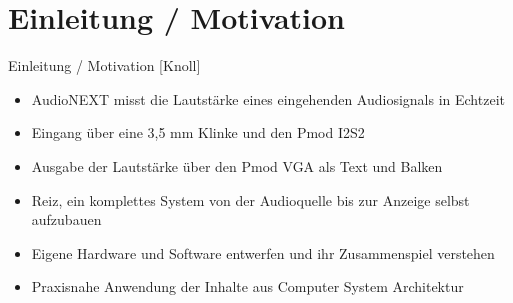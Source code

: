 \section{Einleitung / Motivation}
\begin{frame}{Einleitung / Motivation [Knoll]}
    \begin{itemize}
        \item AudioNEXT misst die Lautstärke eines eingehenden Audiosignals in Echtzeit
        \item Eingang über eine 3,5 mm Klinke und den Pmod I2S2
        \item Ausgabe der Lautstärke über den Pmod VGA als Text und Balken
        \item Reiz, ein komplettes System von der Audioquelle bis zur Anzeige selbst aufzubauen
        \item Eigene Hardware und Software entwerfen und ihr Zusammenspiel verstehen
        \item Praxisnahe Anwendung der Inhalte aus Computer System Architektur
    \end{itemize}
\end{frame}
